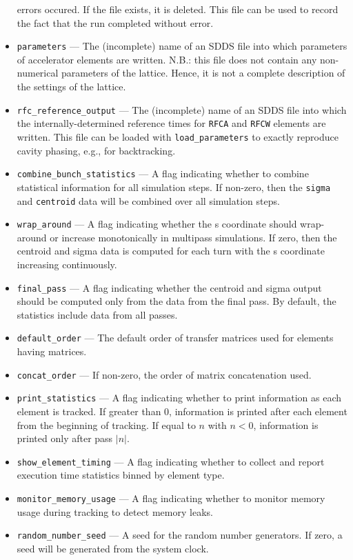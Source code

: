 \documentclass[11pt]{article}
\begin{document}
\begin{itemize}
errors occured.  If the file exists, it is deleted.  This file can be
used to record the fact that the run completed without error.
\item \verb|parameters| --- The (incomplete) name of an SDDS file into
which parameters of accelerator elements are written.
N.B.: this file does not contain any non-numerical parameters of the lattice.
Hence, it is not a complete description of the settings of the lattice.
\item \verb|rfc_reference_output| --- The (incomplete) name of an SDDS file into
which the internally-determined reference times for \verb|RFCA| and \verb|RFCW| 
elements are written. This file can be loaded with \verb|load_parameters| to
exactly reproduce cavity phasing, e.g., for backtracking.
\item \verb|combine_bunch_statistics| --- A flag indicating whether to
combine statistical information for all simulation steps.  If
non-zero, then the \verb|sigma| and \verb|centroid| data will be
combined over all simulation steps.
\item \verb|wrap_around| --- A flag indicating whether the s
 coordinate should wrap-around or increase monotonically in multipass
 simulations.  If zero, then the centroid and sigma data is computed for
 each turn with the s coordinate increasing continuously.
\item \verb|final_pass| --- A flag indicating whether the centroid and
 sigma output should be computed only from the data from the final pass.
 By default, the statistics include data from all passes.
\item \verb|default_order| --- The default order of transfer matrices
used for elements having matrices.
\item \verb|concat_order| --- If non-zero, the order of matrix
concatenation used.
\item \verb|print_statistics| --- A flag indicating whether to print
information as each element is tracked. If greater than 0, information is printed after each element from the beginning of tracking.
If equal to $n$ with $n<0$, information is printed only after pass $\left|n\right|$.
\item \verb|show_element_timing| --- A flag indicating whether to collect and report execution time statistics binned by element type.
\item \verb|monitor_memory_usage| --- A flag indicating whether to monitor memory usage during tracking to detect memory leaks.
\item \verb|random_number_seed| --- A seed for the random number generators.  If zero, a seed will be generated from the system clock.

\end{itemize}
\end{document}
